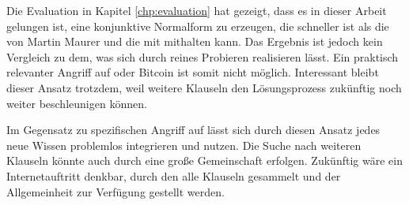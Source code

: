 Die Evaluation in Kapitel \ref{chp:evaluation} hat gezeigt, dass es in dieser Arbeit gelungen ist, eine konjunktive Normalform zu erzeugen, die schneller
ist als die von Martin Maurer und die mit  mithalten kann. Das Ergebnis ist jedoch kein Vergleich zu dem, was sich durch reines Probieren
realisieren lässt. Ein praktisch relevanter Angriff auf  oder Bitcoin ist somit nicht möglich. Interessant bleibt dieser Ansatz trotzdem,
weil weitere Klauseln den Lösungsprozess zukünftig noch weiter beschleunigen können.

Im Gegensatz zu spezifischen Angriff auf  lässt sich durch diesen Ansatz jedes neue Wissen problemlos integrieren und nutzen.
Die Suche nach weiteren Klauseln könnte auch durch eine große Gemeinschaft erfolgen. Zukünftig wäre ein Internetauftritt denkbar, durch den
alle Klauseln gesammelt und der Allgemeinheit zur Verfügung gestellt werden.